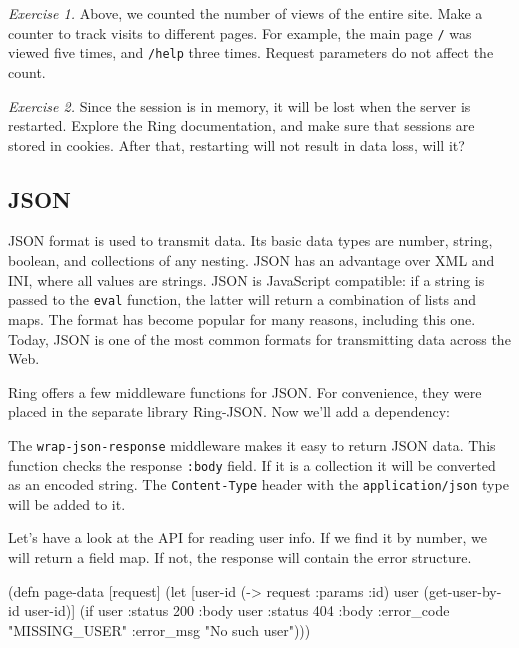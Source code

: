 \emph{Exercise 1.} Above, we counted the number of views of the entire site. Make a counter to track visits to different pages. For example, the main page \verb|/| was
viewed five times, and \verb|/help| three times. Request parameters do not affect the count.

\emph{Exercise 2.} Since the session is in memory, it will be lost when the server is restarted. Explore the Ring documentation, and make sure that sessions are stored in cookies. After that, restarting will not result in data loss, will it?

\subsection{JSON}


JSON format is used to transmit data. Its basic data types are number, string, boolean, and collections of any nesting. JSON has an advantage over XML and INI, where all values are strings. JSON is JavaScript compatible: if a string is passed to the \verb|eval| function, the latter will return a combination of lists and maps. The format has become popular for many reasons, including this one. Today, JSON is one of the most common formats for transmitting data across the Web.

Ring offers a few middleware functions for JSON. For convenience, they were placed in the separate library Ring-JSON. Now we'll add a dependency:

\begin{english}
  \begin{clojure}
  \end{clojure}
\end{english}


The \verb|wrap-json-response| middleware makes it easy to return JSON data. This function checks the response \verb|:body| field. If it is a collection it will be converted as an encoded string. The \verb|Content-Type| header with the \verb|application/json| type will be added to it.

Let's have a look at the API for reading user info. If we find it by number, we will return a field map. If not, the response will contain the error structure.

\ifx\DEVICETYPE\MOBILE

\begin{english}
  \begin{clojure}
(defn page-data [request]
  (let [user-id (-> request :params :id)
        user (get-user-by-id user-id)]
    (if user
      {:status 200 :body user}
      {:status 404
       :body
       {:error_code "MISSING_USER"
        :error_msg "No such user"}})))
  \end{clojure}
\end{english}

